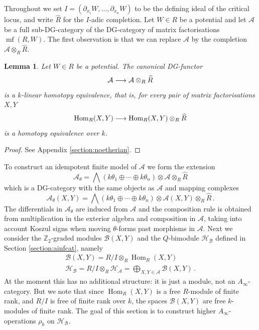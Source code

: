 \documentclass[english,letter paper,12pt,leqno]{article}
\newtheorem{lemma}[theorem]{Lemma}
\theoremstyle{example}
\numberwithin{equation}{section}
\def\AA{\mathcal{A}}
\def\BB{\mathcal{B}}
\def\HH{\HH}
\def\HH{\mathcal{H}}
\def\Hom{\operatorname{Hom}}
\def\be{\begin{equation}}
\def\ee{\end{equation}}
\def\nZ{\mathds{Z}}
\DeclareMathOperator{\mfdg}{mf}
\begin{document}
Throughout we set $I = ( \partial_{x_i} W, \ldots, \partial_{x_n} W )$ to be the defining ideal of the critical locus, and write $\widehat{R}$ for the $I$-adic completion. Let $W \in R$ be a potential and let $\AA$ be a full sub-DG-category of the DG-category of matrix factorisations $\mfdg( R, W )$. The first observation is that we can replace $\AA$ by the completion $\AA \otimes_R \widehat{R}$.

\begin{lemma}\label{lemma:completion_he} Let $W \in R$ be a potential. The canonical DG-functor
\[
\AA \lto \AA \otimes_R \widehat{R}
\]
is a $k$-linear homotopy equivalence, that is, for every pair of matrix factorisations $X,Y$
\[
\Hom_R(X,Y) \lto \Hom_R(X,Y) \otimes_R \widehat{R}
\]
is a homotopy equivalence over $k$.
\end{lemma}
\begin{proof}
See Appendix \ref{section:noetherian}.
\end{proof}

To construct an idempotent finite model of $\AA$ we form the extension
\be\label{eq:defn_AAtheta}
\AA_{\theta} = \bigwedge( k \theta_1 \oplus \cdots \oplus k \theta_n ) \otimes \AA \otimes_R \widehat{R}
\ee
which is a DG-category with the same objects as $\AA$ and mapping complexes
\[
\AA_{\theta}( X, Y ) = \bigwedge( k \theta_1 \oplus \cdots \oplus k \theta_n ) \otimes \AA(X,Y) \otimes_R \widehat{R}\,.
\]
The differentials in $\AA_{\theta}$ are induced from $\AA$ and the composition rule is obtained from multiplication in the exterior algebra and composition in $\AA$, taking into account Koszul signs when moving $\theta$-forms past morphisms in $\AA$. Next we consider the $\nZ_2$-graded modules $\BB(X,Y)$ and the $Q$-bimodule $\HH_{\BB}$ defined in Section \ref{section:ainfcat}, namely
\begin{gather*}
\BB(X,Y) = R/I \otimes_R \Hom_R(X,Y)\\
\HH_{\BB} = R/I \otimes_R \HH_{\AA} = \bigoplus_{X,Y \in \AA} \BB(X,Y)\,.
\end{gather*}
At the moment this has no additional structure: it is just a module, not an $A_\infty$-category. But we note that since $\Hom_R(X,Y)$ is a free $R$-module of finite rank, and $R/I$ is free of finite rank over $k$, the spaces $\BB(X,Y)$ are free $k$-modules of finite rank. The goal of this section is to construct higher $A_\infty$-operations $\rho_k$ on $\HH_{\BB}$. %
\end{document}
